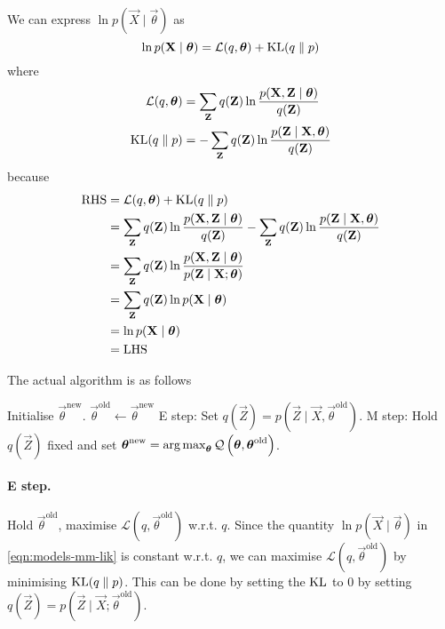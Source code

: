 We can express $\ln p(\vec X \mid \vec \theta)$ as
\begin{equation}
    \ln p(\boldsymbol{\mathbf{X}} \mid \boldsymbol{\mathbf{\theta}}) = \mathcal L(q, \boldsymbol{\mathbf{\theta}}) + \operatorname{KL}(q \parallel p) \label{eqn:models-mm-lik}
\end{equation}
where
\begin{align}
    \mathcal L(q, \boldsymbol{\mathbf{\theta}})  &= \sum_{\boldsymbol{\mathbf{Z}}} q(\boldsymbol{\mathbf{Z}}) \ln \frac{p(\boldsymbol{\mathbf{X}}, \boldsymbol{\mathbf{Z}} \mid \boldsymbol{\mathbf{\theta}})}{q(\boldsymbol{\mathbf{Z}})} \\
    \operatorname{KL}(q \parallel p)          &= -\sum_{\boldsymbol{\mathbf{Z}}} q(\boldsymbol{\mathbf{Z}}) \ln \frac{p(\boldsymbol{\mathbf{Z}} \mid \boldsymbol{\mathbf{X}}, \boldsymbol{\mathbf{\theta}})}{q(\boldsymbol{\mathbf{Z}})}
\end{align}
because
\begin{align*}
    \text{RHS}  &= \mathcal L(q, \boldsymbol{\mathbf{\theta}}) + \operatorname{KL}(q \parallel p)\\
                &= \sum_{\boldsymbol{\mathbf{Z}}} q(\boldsymbol{\mathbf{Z}}) \ln \frac{p(\boldsymbol{\mathbf{X}}, \boldsymbol{\mathbf{Z}} \mid \boldsymbol{\mathbf{\theta}})}{q(\boldsymbol{\mathbf{Z}})} - \sum_{\boldsymbol{\mathbf{Z}}} q(\boldsymbol{\mathbf{Z}}) \ln \frac{p(\boldsymbol{\mathbf{Z}} \mid \boldsymbol{\mathbf{X}}, \boldsymbol{\mathbf{\theta}})}{q(\boldsymbol{\mathbf{Z}})} \\
                &= \sum_{\boldsymbol{\mathbf{Z}}} q(\boldsymbol{\mathbf{Z}}) \ln \frac{p(\boldsymbol{\mathbf{X}}, \boldsymbol{\mathbf{Z}} \mid \boldsymbol{\mathbf{\theta}})}{p(\boldsymbol{\mathbf{Z}} \mid \boldsymbol{\mathbf{X}}; \boldsymbol{\mathbf{\theta}})} \\
                &= \sum_{\boldsymbol{\mathbf{Z}}} q(\boldsymbol{\mathbf{Z}}) \ln p(\boldsymbol{\mathbf{X}} \mid \boldsymbol{\mathbf{\theta}}) \\
                &= \ln p(\boldsymbol{\mathbf{X}} \mid \boldsymbol{\mathbf{\theta}}) \\
                &= \text{LHS}
\end{align*}

The actual algorithm is as follows
\begin{algorithmbis}\label{alg:em}
    \begin{algorithmic}[1]
        \State Initialise $\vec \theta^{\text{new}}$.
        \Repeat
            \State $\vec \theta^{\text{old}} \gets \vec \theta^{\text{new}}$
            \State E step: Set $q(\vec Z) = p\left(\vec Z \mid \vec X, \vec \theta^{\text{old}}\right)$.
            \State M step: Hold $q(\vec Z)$ fixed and set $\boldsymbol{\mathbf{\theta}}^{\text{new}} = \operatorname*{arg\,max}_{\boldsymbol{\mathbf{\theta}}} \mathcal Q\left(\boldsymbol{\mathbf{\theta}}, \boldsymbol{\mathbf{\theta}}^{\text{old}}\right)$.
    \end{algorithmic}
\end{algorithmbis}

\paragraph{E step.} Hold $\vec \theta^{\text{old}}$, maximise $\mathcal L\left(q, \vec \theta^{\text{old}}\right)$ w.r.t. $q$. Since the quantity $\ln p(\vec X \mid \vec \theta)$ in \eqref{eqn:models-mm-lik} is constant w.r.t. $q$, we can maximise $\mathcal L\left(q, \vec \theta^{\text{old}}\right)$ by minimising $\operatorname{KL}(q \parallel p)$. This can be done by setting the $\operatorname{KL}$ to $0$ by setting $q(\vec Z) = p(\vec Z \mid \vec X; \vec \theta^{\text{old}})$.

